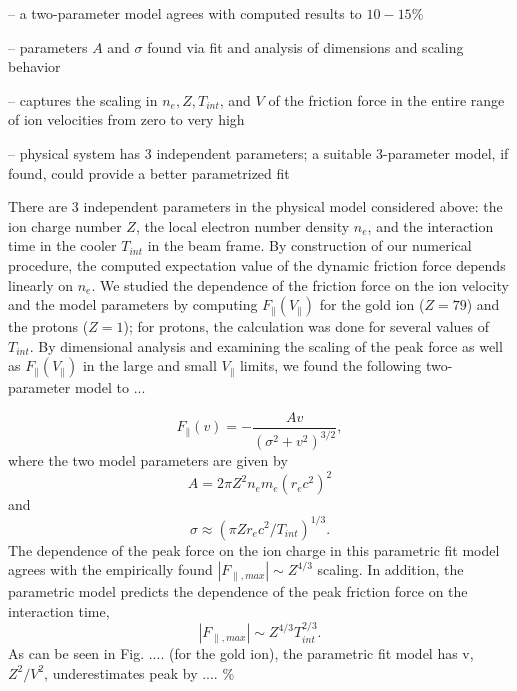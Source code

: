 \documentclass[12pt, reqno]{amsart}
\begin{document}
-- a two-parameter model agrees with computed results to $10-15\%$ 

-- parameters $A$ and $\sigma$ found via fit and analysis of dimensions and scaling behavior 

-- captures the scaling in $n_e, Z, T_{int}$, and $V$ of the friction force in the entire range of ion velocities from zero to very high 

-- physical system has 3 independent parameters; a suitable 3-parameter model, if found, could provide a better parametrized fit  

There are 3 independent parameters in the physical model considered above: the ion charge number $Z$, the local electron number density $n_e$, and the interaction time in the cooler $T_{int}$ in the beam frame.  By construction of our numerical procedure, the computed expectation value of the dynamic friction force depends linearly on $n_e$.  We studied the dependence of the friction force on the ion velocity and the model parameters by computing $F_{\parallel}(V_{\parallel})$ for the gold ion ($Z = 79$) and the protons ($Z = 1$); for protons, the calculation was done for several values of $T_{int}$.  By dimensional analysis and examining the scaling of the peak force as well as $F_{\parallel}(V_{\parallel})$ in the large and small $V_{\parallel}$ limits, we found the following two-parameter model to ...


\begin{equation}
F_{\parallel}(v) = - \frac{A v}{(\sigma^2 + v^2)^{3/2}} ,
\end{equation}
where the two model parameters are given by 
\begin{equation*}
A = 2 \pi Z^2 n_e m_e (r_e c^2)^2 
\end{equation*}
and
\begin{equation*}
\sigma \approx (\pi Z r_e c^2 / T_{int})^{1/3} .
\end{equation*}
The dependence of the peak force on the ion charge in this parametric fit model agrees with the empirically found $|F_{\parallel,max}| \sim Z^{4/3}$ scaling. In addition, the parametric model predicts the dependence of the peak friction force on the interaction time, 
\begin{equation}
|F_{\parallel,max}| \sim Z^{4/3} T_{int}^{2/3}.
\end{equation}
As can be seen in Fig. .... (for the gold ion), the parametric fit model has   v, $Z^2 / V^2$, underestimates peak by .... \%
\end{document}

